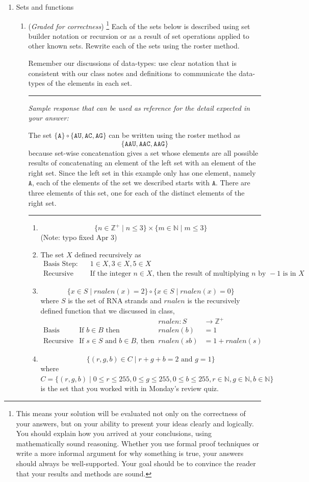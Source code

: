 \documentclass[12pt, oneside]{article}
\newcommand{\gradeCorrect}{({\it Graded for correctness}) }
\newcommand{\gradeCorrectFirst}{\gradeCorrect\footnote{This means your solution 
will be evaluated not only on the correctness of your answers, but on your ability
to present your ideas clearly and logically. You should explain how you 
arrived at your conclusions, using
mathematically sound reasoning. Whether you use formal proof techniques or 
write a more informal argument
for why something is true, your answers should always be well-supported. 
Your goal should be to convince the
reader that your results and methods are sound.} }
\newcommand{\A}[0]{\texttt{A}}
\newcommand{\C}[0]{\texttt{C}}
\newcommand{\G}[0]{\texttt{G}}
\newcommand{\U}[0]{\texttt{U}}
\begin{document}
\begin{enumerate}[labelindent=0pt, leftmargin=0pt]
    \item Sets and functions
    \begin{enumerate}
        \item \gradeCorrectFirst Each of the sets below is described 
using set builder notation or recursion or as a result of set operations
applied to other known sets.  Rewrite each of the sets using the roster method.

Remember our discussions of data-types: use clear notation that 
is consistent with our class notes and definitions 
to communicate the data-types of the elements in each set.


\rule{0.5\textwidth}{.4pt}

{\it Sample response that can be used as reference for the detail expected 
in your answer:} 

The set $\{ \A \} \circ \{ \A\U, \A\C, \A\G\}$ can be written using
the roster method as 
\[
\{ \A\A\U, \A\A\C, \A\A\G \}
\]
because set-wise concatenation gives a set whose elements are 
all possible results of concatenating an element of the 
left set with an 
element of the right set. Since the left set in this example only
has one element, namely $\A$, each of the elements of the set we 
described starts with $\A$. There are three elements of this set, 
one for each of the distinct elements of the right set.

\rule{0.5\textwidth}{.4pt}

\begin{enumerate}
\item $$\{ n \in \mathbb{Z}^+ \mid n \leq 3 \} \times \{ m \in \mathbb{N} \mid m \leq 3\}$$ (Note: typo fixed Apr 3)
\item The set $X$ defined recursively as 
    \[
    \begin{array}{ll}
    \textrm{Basis Step: } & 1 \in X, 3 \in X, 5 \in X \\
    \textrm{Recursive Step: } & \textrm{If the integer } n \in X \textrm{, then the result of multiplying } n \textrm{ by } -1 \textrm{ is in }X
    \end{array}
    \]
\item $$\{ x \in S \mid rnalen(x) = 2 \} \circ \{x \in S \mid rnalen(x) = 0 \}$$
where $S$ is the set of RNA strands and $rnalen$ is the recursively defined
function that we discussed in class,
\[
\begin{array}{llll}
& & \textit{rnalen} : S & \to \mathbb{Z}^+ \\
\textrm{Basis Step:} & \textrm{If } b \in B\textrm{ then } & \textit{rnalen}(b) & = 1 \\
\textrm{Recursive Step:} & \textrm{If } s \in S\textrm{ and }b \in B\textrm{, then  } & \textit{rnalen}(sb) & = 1 + \textit{rnalen}(s)
\end{array}
\]
\item $$\{ (r,g,b) \in C \mid r+g+b = 2 \textrm{ and } g=1\}$$ where 
$C = \{ (r,g,b) \mid 0 \leq r \leq 255, 0 \leq g \leq 255, 0 \leq b \leq 255, r \in \mathbb{N}, g \in \mathbb{N}, b \in \mathbb{N} \}$
is the set that you worked with in Monday's review quiz.
\end{enumerate}


\end{enumerate}
\end{enumerate}
\end{document}
